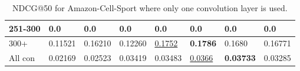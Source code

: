 \begin{table*}[]
\begin{tabular}{|l|l|l|l|l|l|l||l|}
        251-300     & 0.0                            & 0.0                            & 0.0                            & 0.0                            & 0.0                            & 0.0                             & 0.0                        \\ \hline
        300+        & 0.11521                        & 0.16210                        & 0.12260                        & \underline{0.1752}             & \textbf{0.1786}                & 0.1680                          & 0.16771                    \\ \hline
        All con     & 0.02169                        & 0.02523                        & 0.03419                        & 0.03483                        & \underline{0.0366}             & \textbf{0.03733}                & 0.03285                    \\ \hline
    \end{tabular}
    \caption{NDCG@50 for Amazon-Cell-Sport where only one convolution layer is used.}
    \label{tab:Amazon-Cell-Sport-ndcg-evaluation}
\end{table*}

